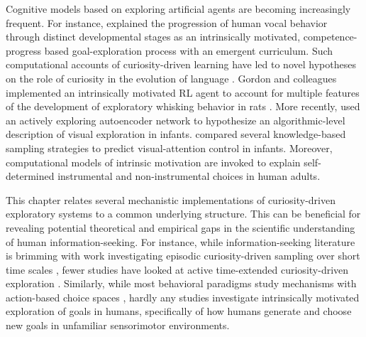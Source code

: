 Cognitive models based on exploring artificial agents are becoming increasingly frequent. For instance, \citeauthor{moulin-frier_self-organization_2014} \citeyearpar{moulin-frier_self-organization_2014} explained the progression of human vocal behavior through distinct developmental stages as an intrinsically motivated, competence-progress based goal-exploration process with an emergent curriculum. Such computational accounts of curiosity-driven learning have led to novel hypotheses on the role of curiosity in the evolution of language \parencite[see][]{oudeyer_how_2016}. Gordon and colleagues implemented an intrinsically motivated \ac{RL} agent to account for multiple features of the development of exploratory whisking behavior in rats \parencite{gordon_hierarchical_2012,gordon_emergent_2014}. More recently, \citeauthor{twomey_curiosity-based_2018} \citeyearpar{twomey_curiosity-based_2018} used an actively exploring autoencoder network to hypothesize an algorithmic-level description of visual exploration in infants. \citeauthor{poli_infants_2020} \citeyearpar{poli_infants_2020} compared several knowledge-based sampling strategies to predict visual-attention control in infants. Moreover, computational models of intrinsic motivation are invoked to explain self-determined instrumental \parencite{gershman_uncertainty_2018} and non-instrumental \parencite{ten_humans_2021} choices in human adults.

This chapter relates several mechanistic implementations of curiosity-driven exploratory systems to a common underlying structure. This can be beneficial for revealing potential theoretical and empirical gaps in the scientific understanding of human information-seeking. For instance, while information-seeking literature is brimming with work investigating episodic curiosity-driven sampling over short time scales \parencite[see][for a recent review]{bazhydai_curiosity_2020}, fewer studies have looked at active time-extended curiosity-driven exploration \parencite[e.g.,][]{holm_episodic_2019,ten_humans_2021}. Similarly, while most behavioral paradigms study mechanisms with action-based choice spaces \parencite[e.g., ][]{twomey_curiosity-based_2018}, hardly any studies investigate intrinsically motivated exploration of goals in humans, specifically of how humans generate and choose new goals in unfamiliar sensorimotor environments.

